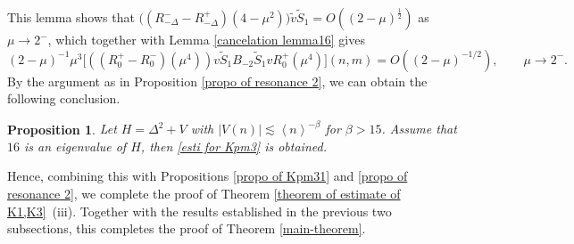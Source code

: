 \documentclass[reqno, 11pt]{amsart}
\newtheorem{proposition}[definition]{Proposition}
\numberwithin{equation}{section}
\begin{document}
This lemma shows that $\big((R^{-}_{-\Delta}-R^{+}_{-\Delta})(4-\mu^2)\big)\tilde{v}\widetilde{S}_1=O((2-\mu)^{\frac{1}{2}})$ as $\mu\rightarrow2^-$, which together with Lemma \ref{cancelation lemma16} gives 
$$(2-\mu)^{-1}\mu^3\big[((R^+_0-R^-_0)(\mu^4))v\widetilde{S}_1B_{-2}\widetilde{S}_1vR^+_0(\mu^4)\big](n,m)=O((2-\mu)^{-1/2}),\qquad \mu\rightarrow2^-.$$
By the argument as in Proposition \ref{propo of resonance 2}, we can obtain the following conclusion.
\begin{proposition}\label{propo of eigenvalue 2}
Let $H=\Delta^2+V$ with $|V(n)|\lesssim \left<n\right>^{-\beta}$ for $\beta>15$. Assume that $16$ is an eigenvalue of $H$, then \eqref{esti for Kpm3} is obtained.
\end{proposition}
Hence, combining this with Propositions \ref{propo of Kpm31} and \ref{propo of resonance 2}, we complete the proof of Theorem \ref{theorem of estimate of K1,K3}~(iii). Together with the results established in the previous two subsections, this completes the proof of Theorem \ref{main-theorem}.
\end{document}
